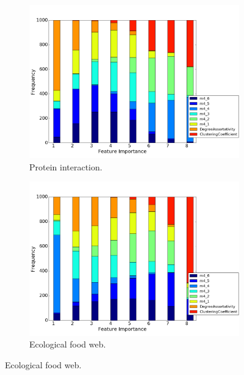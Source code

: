 \begin{figure}[H]
\begin{subfigure}{0.48\textwidth}
\includegraphics[width=\linewidth]{figs/one_by_many/protein/feature_importance.png}
\caption{Protein interaction.} \label{protein_feature}
\end{subfigure}\hspace*{\fill}
\begin{subfigure}{0.48\textwidth}
\includegraphics[width=\linewidth]{figs/one_by_many/food_web/feature_importance.png}
\caption{Ecological food web.} \label{foodweb_feature}
\end{subfigure}


\end{figure}
